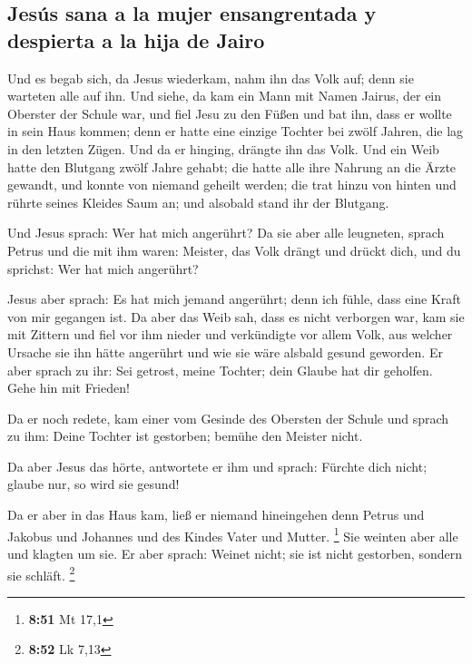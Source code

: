 \hypertarget{jesuxfas-sana-a-la-mujer-ensangrentada-y-despierta-a-la-hija-de-jairo}{%
\subsection{Jesús sana a la mujer ensangrentada y despierta a la hija de
Jairo}\label{jesuxfas-sana-a-la-mujer-ensangrentada-y-despierta-a-la-hija-de-jairo}}

 Und es begab sich, da Jesus wiederkam, nahm ihn das Volk
auf; denn sie warteten alle auf ihn.  Und siehe, da kam
ein Mann mit Namen Jairus, der ein Oberster der Schule war, und fiel
Jesu zu den Füßen und bat ihn, dass er wollte in sein Haus kommen;
 denn er hatte eine einzige Tochter bei zwölf Jahren, die
lag in den letzten Zügen. Und da er hinging, drängte ihn das Volk.
 Und ein Weib hatte den Blutgang zwölf Jahre gehabt; die
hatte alle ihre Nahrung an die Ärzte gewandt, und konnte von niemand
geheilt werden;  die trat hinzu von hinten und rührte
seines Kleides Saum an; und alsobald stand ihr der Blutgang.

 Und Jesus sprach: Wer hat mich angerührt? Da sie aber
alle leugneten, sprach Petrus und die mit ihm waren: Meister, das Volk
drängt und drückt dich, und du sprichst: Wer hat mich angerührt?

 Jesus aber sprach: Es hat mich jemand angerührt; denn
ich fühle, dass eine Kraft von mir gegangen ist.  Da aber
das Weib sah, dass es nicht verborgen war, kam sie mit Zittern und fiel
vor ihm nieder und verkündigte vor allem Volk, aus welcher Ursache sie
ihn hätte angerührt und wie sie wäre alsbald gesund geworden.
 Er aber sprach zu ihr: Sei getrost, meine Tochter; dein
Glaube hat dir geholfen. Gehe hin mit Frieden!

 Da er noch redete, kam einer vom Gesinde des Obersten
der Schule und sprach zu ihm: Deine Tochter ist gestorben; bemühe den
Meister nicht.

 Da aber Jesus das hörte, antwortete er ihm und sprach:
Fürchte dich nicht; glaube nur, so wird sie gesund!

 Da er aber in das Haus kam, ließ er niemand hineingehen
denn Petrus und Jakobus und Johannes und des Kindes Vater und Mutter.
\footnote{\textbf{8:51} Mt 17,1}  Sie weinten aber alle
und klagten um sie. Er aber sprach: Weinet nicht; sie ist nicht
gestorben, sondern sie schläft. \footnote{\textbf{8:52} Lk 7,13}

